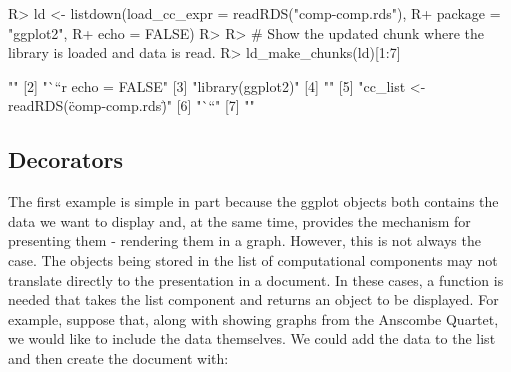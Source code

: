 \documentclass[
]{jss}
\begin{document}
\begin{CodeChunk}

\begin{CodeInput}
R> ld <- listdown(load_cc_expr = readRDS("comp-comp.rds"), 
R+                package = "ggplot2",
R+                echo = FALSE)
R> 
R> # Show the updated chunk where the library is loaded and data is read.
R> ld_make_chunks(ld)[1:7]
\end{CodeInput}

\begin{CodeOutput}
[1] ""                                     
[2] "```{r echo = FALSE}"                  
[3] "library(ggplot2)"                     
[4] ""                                     
[5] "cc_list <- readRDS(\"comp-comp.rds\")"
[6] "```"                                  
[7] ""                                     
\end{CodeOutput}
\end{CodeChunk}

\hypertarget{decorators}{%
\subsection{Decorators}\label{decorators}}

The first example is simple in part because the ggplot objects both
contains the data we want to display and, at the same time, provides the
mechanism for presenting them - rendering them in a graph. However, this
is not always the case. The objects being stored in the list of
computational components may not translate directly to the presentation
in a document. In these cases, a function is needed that takes the list
component and returns an object to be displayed. For example, suppose
that, along with showing graphs from the Anscombe Quartet, we would like
to include the data themselves. We could add the data to the
 list and then create the document with:

\begin{CodeChunk}


\end{CodeChunk}
\end{document}
